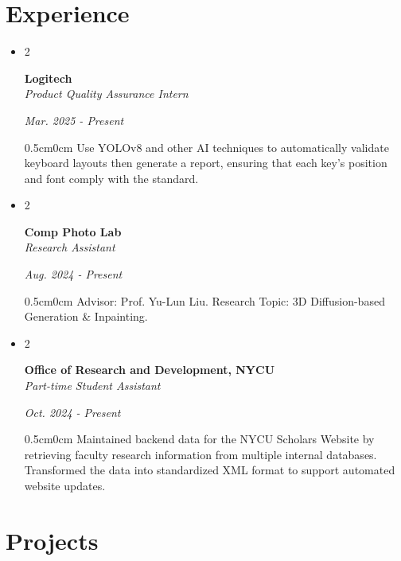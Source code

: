 \documentclass[10pt, letterpaper]{article}
\newenvironment{twocolentry}[2][]{
    \onecolentry
    \def\secondColumn{#2}
    \setcolumnwidth{\fill, 4.5 cm}
    \begin{paracol}{2}
}{
    \switchcolumn \raggedleft \secondColumn
    \end{paracol}
    \endonecolentry
}
\begin{document}
    \section{Experience}
        \begin{itemize}[leftmargin=0.4cm]
            \item \begin{twocolentry}{\textit{Mar. 2025 - Present}}
                \textbf{Logitech} \\
                \textit{Product Quality Assurance Intern}
              \end{twocolentry}
              \begin{adjustwidth}{0.5cm}{0cm}
              Use YOLOv8 and other AI techniques to automatically validate keyboard layouts then generate a report, ensuring that each key's position and font comply with the standard.
              \end{adjustwidth}
            
            \item \begin{twocolentry}{\textit{Aug. 2024 - Present}}
                \textbf{Comp Photo Lab} \\
                \textit{Research Assistant}
              \end{twocolentry}
              \begin{adjustwidth}{0.5cm}{0cm}
                Advisor: Prof. Yu-Lun Liu. Research Topic: 3D Diffusion-based Generation \& Inpainting.
              \end{adjustwidth}
            
            \item \begin{twocolentry}{\textit{Oct. 2024 - Present}}
                \textbf{Office of Research and Development, NYCU} \\
                \textit{Part-time Student Assistant}
              \end{twocolentry}
              \begin{adjustwidth}{0.5cm}{0cm}
                Maintained backend data for the NYCU Scholars Website by retrieving faculty research information from multiple internal databases. Transformed the data into standardized XML format to support automated website updates.
              \end{adjustwidth}
        \end{itemize}

    \section{Projects}
\end{document}

